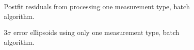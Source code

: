 \documentclass[]{aiaa-tc}%
\begin{document}
	\begin{figure}[H]
		\centering
		\caption{Postfit residuals from processing one measurement type, batch algorithm. }
		\label{fig:Postfit_Single_meas}
	\end{figure}	

	\begin{figure}[H]
		\centering
		\caption{3$\sigma$ error ellipsoids using only one measurement type, batch algorithm. }
		\label{fig:ErrorEllipsoids_Single_meas}
	\end{figure}	
\end{document}
